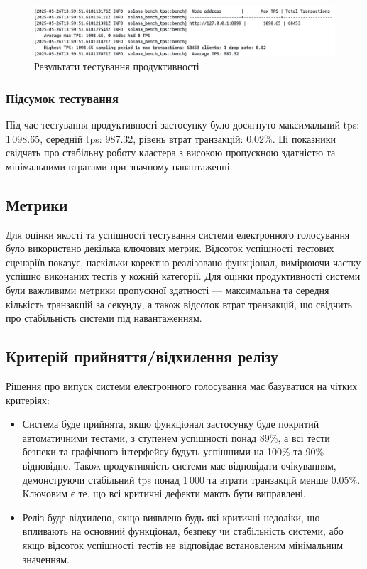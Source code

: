 \documentclass[14pt]{extreport}
\begin{document}
  \begin{figure}[H]
    \centering
    \includegraphics[width=\textwidth]{ProdTest}
    \caption{Результати тестування продуктивності}
    \label{fig:prodtests}
  \end{figure}
  
  \subsubsection*{Підсумок тестування}
  
  Під час тестування продуктивності застосунку було досягнуто максимальний \gls{tps}: 1\,098.65, середній \gls{tps}: 987.32, рівень втрат транзакцій: 0.02\%. Ці показники свідчать про стабільну роботу кластера з високою пропускною здатністю та мінімальними втратами при значному навантаженні.
  
  \subsection{Метрики}
  
  Для оцінки якості та успішності тестування системи електронного голосування було використано декілька ключових метрик. Відсоток успішності тестових сценаріїв показує, наскільки коректно реалізовано функціонал, вимірюючи частку успішно виконаних тестів у кожній категорії. Для оцінки продуктивності системи були важливими метрики пропускної здатності --- максимальна та середня кількість транзакцій за секунду, а також відсоток втрат транзакцій, що свідчить про стабільність системи під навантаженням.
  
  \subsection{Критерій прийняття/відхилення релізу}
  
  Рішення про випуск системи електронного голосування має базуватися на чітких критеріях:

  \begin{itemize}
    \item Система буде прийнята, якщо функціонал застосунку буде покритий автоматичними тестами, з ступенем успішності понад 89\%, а всі тести безпеки та графічного інтерфейсу будуть успішними на 100\% та 90\% відповідно. Також продуктивність системи має відповідати очікуванням, демонструючи стабільний \gls{tps} понад 1\,000 та втрати транзакцій менше 0.05\%. Ключовим є те, що всі критичні дефекти мають бути виправлені.
    \item Реліз буде відхилено, якщо виявлено будь-які критичні недоліки, що впливають на основний функціонал, безпеку чи стабільність системи, або якщо відсоток успішності тестів не відповідає встановленим мінімальним значенням.
  \end{itemize}
  
\end{document}
